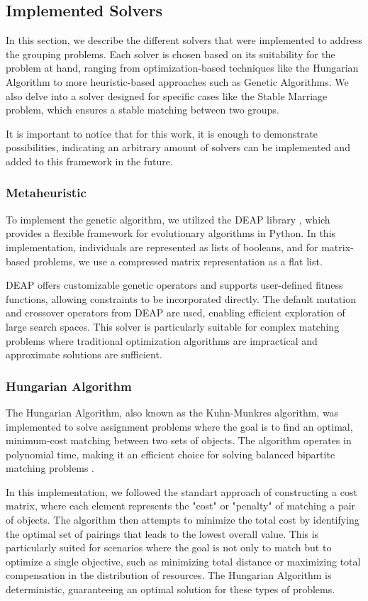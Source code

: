     \subsection{Implemented Solvers}
    \label{sec:implemented_solvers}
    In this section, we describe the different solvers that were implemented to address the grouping problems. Each solver is chosen based on its suitability for the problem at hand, ranging from optimization-based techniques like the Hungarian Algorithm to more heuristic-based approaches such as Genetic Algorithms. We also delve into a solver designed for specific cases like the Stable Marriage problem, which ensures a stable matching between two groups.

    It is important to notice that for this work, it is enough to demonstrate possibilities, indicating an arbitrary amount of solvers can be implemented and added to this framework in the future.

    \subsubsection{Metaheuristic}
        To implement the genetic algorithm, we utilized the DEAP library \cite{deap}, which provides a flexible framework for evolutionary algorithms in Python.
        In this implementation, individuals are represented as lists of booleans, and for matrix-based problems, we use a compressed matrix representation as a flat list.

        DEAP offers customizable genetic operators and supports user-defined fitness functions, allowing constraints to be incorporated directly. The default mutation and crossover operators from DEAP are used, enabling efficient exploration of large search spaces. This solver is particularly suitable for complex matching problems where traditional optimization algorithms are impractical and approximate solutions are sufficient.
    \subsubsection{Hungarian Algorithm}
    The Hungarian Algorithm, also known as the Kuhn-Munkres algorithm, was implemented to solve assignment problems where the goal is to find an optimal, minimum-cost matching between two sets of objects. The algorithm operates in polynomial time, making it an efficient choice for solving balanced bipartite matching problems \cite{kuhn1955hungarian}. 
    
    In this implementation, we followed the standart approach of constructing a cost matrix, where each element represents the "cost" or "penalty" of matching a pair of objects. The algorithm then attempts to minimize the total cost by identifying the optimal set of pairings that leads to the lowest overall value. This is particularly suited for scenarios where the goal is not only to match but to optimize a single objective, such as minimizing total distance or maximizing total compensation in the distribution of resources. The Hungarian Algorithm is deterministic, guaranteeing an optimal solution for these types of problems.

